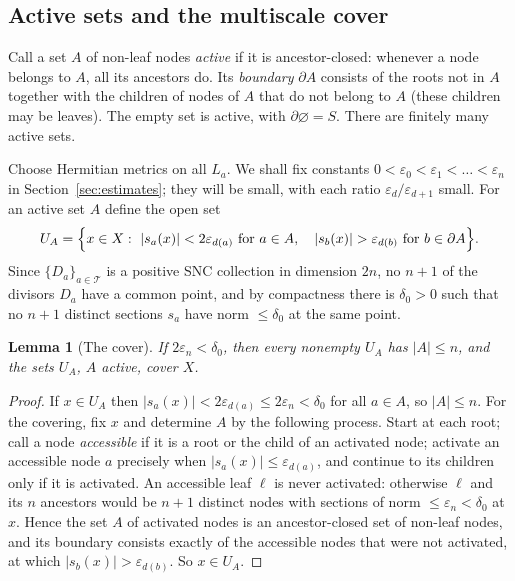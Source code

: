 \documentclass[11pt]{article}
\newtheorem{lemma}[theorem]{Lemma}
\theoremstyle{remark}
\newcommand{\eps}{\varepsilon}
\newcommand{\cT}{\mathcal T}
\begin{document}
\subsection*{Active sets and the multiscale cover}
Call a set $A$ of non-leaf nodes \emph{active} if it is
ancestor-closed: whenever a node belongs to $A$, all its ancestors do.
Its \emph{boundary} $\partial A$ consists of the roots not in $A$
together with the children of nodes of $A$ that do not belong to $A$
(these children may be leaves). The empty set is active, with
$\partial\varnothing=S$. There are finitely many active sets.

Choose Hermitian metrics on all $L_a$. We shall fix constants
$0<\eps_0<\eps_1<\dots<\eps_n$ in Section~\ref{sec:estimates}; they
will be small, with each ratio $\eps_d/\eps_{d+1}$ small. For an active
set $A$ define the open set
\begin{equation}\label{eq:UA}
 U_A=\Bigl\{x\in X:\
 |s_a(x)|<2\eps_{d(a)}\ \text{for }a\in A,\quad
 |s_b(x)|>\eps_{d(b)}\ \text{for }b\in\partial A\Bigr\}.
\end{equation}
Since $\{D_a\}_{a\in\cT}$ is a
positive SNC collection in dimension $2n$, no $n+1$ of the divisors
$D_a$ have a common point, and by compactness there is $\delta_0>0$
such that no $n+1$ distinct sections $s_a$ have norm $\le\delta_0$ at
the same point.

\begin{lemma}[The cover]\label{lem:cover}
If $2\eps_n<\delta_0$, then every nonempty $U_A$ has $|A|\le n$, and
the sets $U_A$, $A$ active, cover $X$.
\end{lemma}

\begin{proof}
If $x\in U_A$ then $|s_a(x)|<2\eps_{d(a)}\le2\eps_n<\delta_0$ for all
$a\in A$, so $|A|\le n$. For the covering, fix $x$ and determine $A$ by
the following process. Start at each root; call a node
\emph{accessible} if it is a root or the child of an activated node;
activate an accessible node $a$ precisely when $|s_a(x)|\le\eps_{d(a)}$,
and continue to its children only if it is activated. An accessible
leaf $\ell$ is never activated: otherwise $\ell$ and its $n$ ancestors
would be $n+1$ distinct nodes with sections of norm
$\le\eps_n<\delta_0$ at $x$. Hence the set $A$ of activated nodes is an
ancestor-closed set of non-leaf nodes, and its boundary consists
exactly of the accessible nodes that were not activated, at which
$|s_b(x)|>\eps_{d(b)}$. So $x\in U_A$.
\end{proof}
\end{document}
